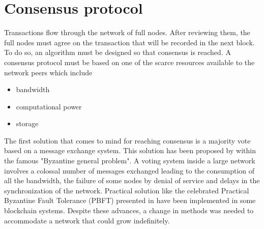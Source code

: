 \chapter{Consensus protocol}\label{chap:consensus}
Transactions flow through the network of full nodes. After reviewing them, the full nodes must agree on the transaction that will be recorded in the next block. To do so, an algorithm must be designed so that consensus is reached.
A consensus protocol must be based on one of the scarce resources available to the network peers which include
\begin{itemize}
	\item bandwidth
	\item computational power
	\item storage 
\end{itemize}
The first solution that comes to mind for reaching consensus is a majority vote based on a message exchange system. This solution has been proposed by \citet{lamport1982the} within the famous "Byzantine general problem". A voting system inside a large network involves a colossal number of messages exchanged leading to the consumption of all the bandwidth, the failure of some nodes by denial of service and delays in the synchronization of the network. Practical solution like the celebrated Practical Byzantine Fault Tolerance (PBFT) presented in \citet{10.5555/296806.296824} have been implemented in some blockchain systems. Despite these advances, a change in methods was needed to accommodate a network that could grow indefinitely.\\

